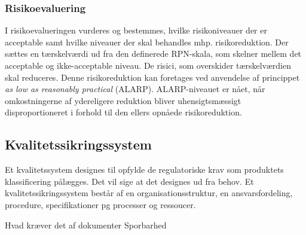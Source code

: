	\subsubsection{Risikoevaluering}  
	I risikoevalueringen vurderes og bestemmes, hvilke risikoniveauer der er acceptable samt hvilke niveauer der skal behandles mhp. risikoreduktion. Der sættes en tærskelværdi ud fra den definerede RPN-skala, som skelner mellem det acceptable og ikke-acceptable niveau. De risici, som overskider tærskelværdien skal reduceres. Denne risikoreduktion kan foretages ved anvendelse af princippet \textit{as low as reasonably practical}{} (ALARP). ALARP-niveauet er nået, når omkostningerne af ydereligere reduktion bliver uhensigtsmæssigt disproportioneret i forhold til den ellers opnåede risikoreduktion.    

\subsection{Kvalitetssikringssystem}

Et kvalitetssystem designes til opfylde de regulatoriske krav som produktets klassificering pålægges. Det vil sige at det designes ud fra behov. 
Et kvalitetssikringssystem består af en organisationsstruktur, en ansvarsfordeling, procedure, specifikationer pg processer og ressoucer. 

Hvad kræver det af dokumenter
Sporbarhed


